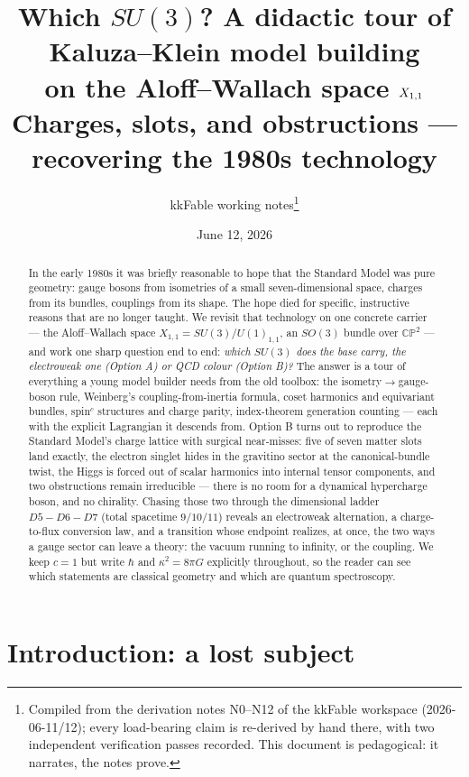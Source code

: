 \documentclass[11pt]{article}
\title{\textbf{Which $SU(3)$? A didactic tour of Kaluza--Klein model building\\ on the Aloff--Wallach space $\X$}\\[1ex]
\large Charges, slots, and obstructions --- recovering the 1980s technology}
\author{kkFable working notes\thanks{Compiled from the derivation notes N0--N12 of the kkFable workspace
(2026-06-11/12); every load-bearing claim is re-derived by hand there, with two independent
verification passes recorded. This document is pedagogical: it narrates, the notes prove.}}
\date{June 12, 2026}
\newcommand{\X}{X_{1,1}}
\newcommand{\CP}{\mathbb{CP}}
\newcommand{\hb}{\hbar}
\begin{document}
\maketitle

\begin{abstract}
\noindent In the early 1980s it was briefly reasonable to hope that the Standard Model was
pure geometry: gauge bosons from isometries of a small seven-dimensional space, charges from
its bundles, couplings from its shape. The hope died for specific, instructive reasons that
are no longer taught. We revisit that technology on one concrete carrier --- the Aloff--Wallach
space $\X=SU(3)/U(1)_{1,1}$, an $SO(3)$ bundle over $\CP^2$ --- and work one sharp question
end to end: \emph{which $SU(3)$ does the base carry, the electroweak one (Option A) or QCD
colour (Option B)?} The answer is a tour of everything a young model builder needs from the
old toolbox: the isometry$\to$gauge-boson rule, Weinberg's coupling-from-inertia formula,
coset harmonics and equivariant bundles, spin$^c$ structures and charge parity, index-theorem
generation counting --- each with the explicit Lagrangian it descends from. Option B turns out
to reproduce the Standard Model's charge lattice with surgical near-misses: five of seven
matter slots land exactly, the electron singlet hides in the gravitino sector at the
canonical-bundle twist, the Higgs is forced out of scalar harmonics into internal tensor
components, and two obstructions remain irreducible --- there is no room for a dynamical
hypercharge boson, and no chirality. Chasing those two through the dimensional ladder
$D5\!-\!D6\!-\!D7$ (total spacetime $9/10/11$) reveals an electroweak alternation, a
charge-to-flux conversion law, and a transition whose endpoint realizes, at once, the two
ways a gauge sector can leave a theory: the vacuum running to infinity, or the coupling.
We keep $c=1$ but write $\hb$ and $\kappa^2=8\pi G$ explicitly throughout, so the reader can
see which statements are classical geometry and which are quantum spectroscopy.
\end{abstract}

\tableofcontents

\section{Introduction: a lost subject}
\end{document}
